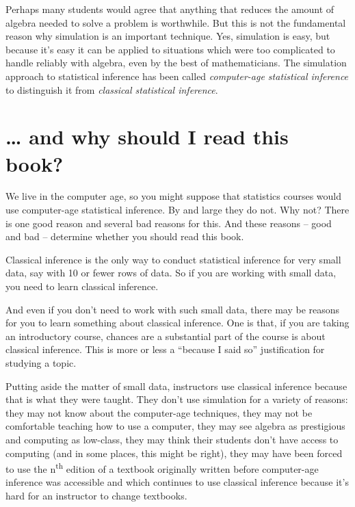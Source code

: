 \documentclass[]{book}
\begin{document}
Perhaps many students would agree that anything that reduces the amount of algebra needed to solve a problem is worthwhile. But this is not the fundamental reason why simulation is an important technique. Yes, simulation is easy, but because it's easy it can be applied to situations which were too complicated to handle reliably with algebra, even by the best of mathematicians. The simulation approach to statistical inference has been called \emph{computer-age statistical inference} to distinguish it from \emph{classical statistical inference}.

\hypertarget{and-why-should-i-read-this-book}{%
\section*{\ldots{} and why should I read this book?}\label{and-why-should-i-read-this-book}}

We live in the computer age, so you might suppose that statistics courses would use computer-age statistical inference. By and large they do not. Why not? There is one good reason and several bad reasons for this. And these reasons -- good and bad -- determine whether you should read this book.

Classical inference is the only way to conduct statistical inference for very small data, say with 10 or fewer rows of data. So if you are working with small data, you need to learn classical inference.

And even if you don't need to work with such small data, there may be reasons for you to learn something about classical inference. One is that, if you are taking an introductory course, chances are a substantial part of the course is about classical inference. This is more or less a ``because I said so'' justification for studying a topic.

Putting aside the matter of small data, instructors use classical inference because that is what they were taught. They don't use simulation for a variety of reasons: they may not know about the computer-age techniques, they may not be comfortable teaching how to use a computer, they may see algebra as prestigious and computing as low-class, they may think their students don't have access to computing (and in some places, this might be right), they may have been forced to use the n\textsuperscript{th} edition of a textbook originally written before computer-age inference was accessible and which continues to use classical inference because it's hard for an instructor to change textbooks.
\end{document}
